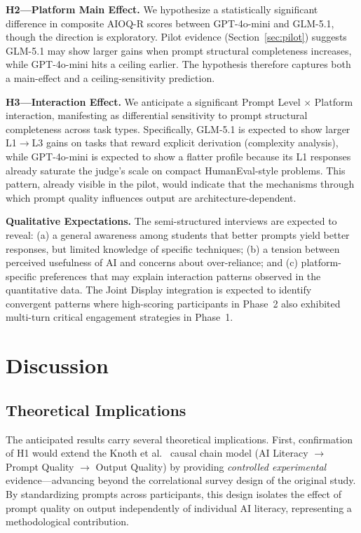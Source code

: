 \documentclass[runningheads]{llncs}
\begin{document}
\textbf{H2---Platform Main Effect.} We hypothesize a statistically significant difference in composite AIOQ-R scores between GPT-4o-mini and GLM-5.1, though the direction is exploratory. Pilot evidence (Section~\ref{sec:pilot}) suggests GLM-5.1 may show larger gains when prompt structural completeness increases, while GPT-4o-mini hits a ceiling earlier. The hypothesis therefore captures both a main-effect and a ceiling-sensitivity prediction.

\textbf{H3---Interaction Effect.} We anticipate a significant Prompt Level $\times$ Platform interaction, manifesting as differential sensitivity to prompt structural completeness across task types. Specifically, GLM-5.1 is expected to show larger L1$\to$L3 gains on tasks that reward explicit derivation (complexity analysis), while GPT-4o-mini is expected to show a flatter profile because its L1 responses already saturate the judge's scale on compact HumanEval-style problems. This pattern, already visible in the pilot, would indicate that the mechanisms through which prompt quality influences output are architecture-dependent.

\textbf{Qualitative Expectations.} The semi-structured interviews are expected to reveal: (a) a general awareness among students that better prompts yield better responses, but limited knowledge of specific techniques; (b) a tension between perceived usefulness of AI and concerns about over-reliance; and (c) platform-specific preferences that may explain interaction patterns observed in the quantitative data. The Joint Display integration is expected to identify convergent patterns where high-scoring participants in Phase~2 also exhibited multi-turn critical engagement strategies in Phase~1.

\section{Discussion}\label{sec:discussion}

\subsection{Theoretical Implications}

The anticipated results carry several theoretical implications. First, confirmation of H1 would extend the Knoth et al.~\cite{Knoth2024} causal chain model (AI Literacy $\rightarrow$ Prompt Quality $\rightarrow$ Output Quality) by providing \emph{controlled experimental} evidence---advancing beyond the correlational survey design of the original study. By standardizing prompts across participants, this design isolates the effect of prompt quality on output independently of individual AI literacy, representing a methodological contribution.
\end{document}
